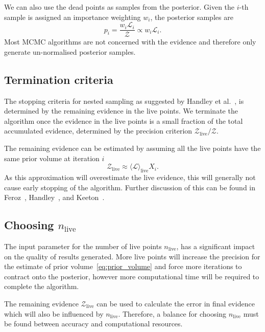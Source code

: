 \documentclass[11pt]{article}
\begin{document}
    We can also use the dead points as samples from the posterior.
    Given the $i$-th sample is assigned an importance weighting $w_i$, the posterior samples are
    \begin{equation}\label{eq:posterior_ns}
        p_i = \frac{w_i \mathcal{L}_i}{\mathcal{Z}} \propto w_i \mathcal{L}_i.
    \end{equation}
    Most MCMC algorithms are not concerned with the evidence and therefore only generate un-normalised posterior samples.

\subsection{Termination criteria}\label{subsec:termination_criteria}
    The stopping criteria for nested sampling as suggested by Handley et al.~\cite{Handley_2015}, is determined by
    the remaining evidence in the live points.
    We terminate the algorithm once the evidence in the live points is a small fraction of the total accumulated evidence,
    determined by the precision criterion $\mathcal{Z}_{\text{live}} / \mathcal{Z}$.

    The remaining evidence can be estimated by assuming all the live points have the same prior volume at iteration $i$
    \begin{equation}\label{eq:remaining_evidence}
    \mathcal{Z}_{\text{live}} \approx \langle \mathcal{L} \rangle_{\text{live}} X_i.
    \end{equation}
    As this approximation will overestimate the live evidence, this will generally not cause early stopping of the algorithm.
    Further discussion of this can be found in Feroz~\cite{Feroz_2009}, Handley~\cite{Handley_2015}, and
    Keeton~\cite{keeton2011statistical}.

    \subsection{Choosing $n_{\text{live}}$}\label{subsec:ns_termination}
    The input parameter for the number of live points $n_{\text{live}}$, has a significant impact on the quality of results generated.
    More live points will increase the precision for the estimate of prior volume~\eqref{eq:prior_volume} and force more
    iterations to contract onto the posterior, however more computational time will be required to complete the algorithm.

    The remaining evidence $\mathcal{Z}_{\text{live}}$ can be used to calculate the error in final
    evidence~\cite{keeton2011statistical, Handley_2015} which will also be influenced by $n_{\text{live}}$.
    Therefore, a balance for choosing $n_{\text{live}}$ must be found between accuracy and computational resources.
\end{document}
